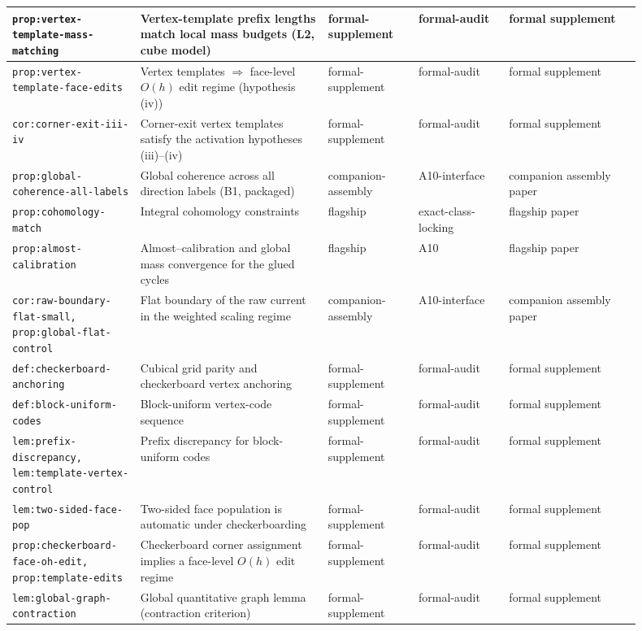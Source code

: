 \documentclass[11pt]{article}
\numberwithin{equation}{section}  %
\theoremstyle{plain}
\theoremstyle{definition}
\theoremstyle{remark}
\begin{document}
\begin{longtable}{|p{0.18\linewidth}|p{0.27\linewidth}|p{0.13\linewidth}|p{0.13\linewidth}|p{0.19\linewidth}|}
\texttt{prop:vertex-template-mass-matching} & Vertex-template prefix lengths match local mass budgets (L2, cube model) & formal-supplement & formal-audit & formal supplement \\ \hline
\texttt{prop:vertex-template-face-edits} & Vertex templates $\Rightarrow$ face-level $O(h)$ edit regime (hypothesis \textnormal{(iv)}) & formal-supplement & formal-audit & formal supplement \\ \hline
\texttt{cor:corner-exit-iii-iv} & Corner-exit vertex templates satisfy the activation hypotheses (iii)--(iv) & formal-supplement & formal-audit & formal supplement \\ \hline
\texttt{prop:global-coherence-all-labels} & Global coherence across all direction labels (B1, packaged) & companion-assembly & A10-interface & companion assembly paper \\ \hline
\texttt{prop:cohomology-match} & Integral cohomology constraints & flagship & exact-class-locking & flagship paper \\ \hline
\texttt{prop:almost-calibration} & Almost--calibration and global mass convergence for the glued cycles & flagship & A10 & flagship paper \\ \hline
\texttt{cor:raw-boundary-flat-small, prop:global-flat-control} & Flat boundary of the raw current in the weighted scaling regime & companion-assembly & A10-interface & companion assembly paper \\ \hline
\texttt{def:checkerboard-anchoring} & Cubical grid parity and checkerboard vertex anchoring & formal-supplement & formal-audit & formal supplement \\ \hline
\texttt{def:block-uniform-codes} & Block-uniform vertex-code sequence & formal-supplement & formal-audit & formal supplement \\ \hline
\texttt{lem:prefix-discrepancy, lem:template-vertex-control} & Prefix discrepancy for block-uniform codes & formal-supplement & formal-audit & formal supplement \\ \hline
\texttt{lem:two-sided-face-pop} & Two-sided face population is automatic under checkerboarding & formal-supplement & formal-audit & formal supplement \\ \hline
\texttt{prop:checkerboard-face-oh-edit, prop:template-edits} & Checkerboard corner assignment implies a face-level $O(h)$ edit regime & formal-supplement & formal-audit & formal supplement \\ \hline
\texttt{lem:global-graph-contraction} & Global quantitative graph lemma (contraction criterion) & formal-supplement & formal-audit & formal supplement \\ \hline

\end{longtable}
\end{document}
